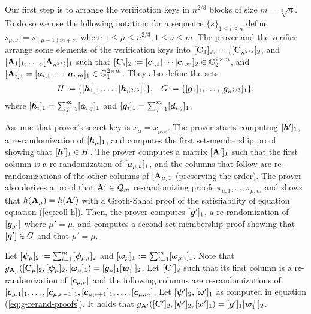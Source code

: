 Our first step is to arrange the verification keys in $n^{2/3}$ blocks of size $m=\sqrt[3]{n}$. To do so we use the following notation: for a sequence $\{s\}_{1\leq i \leq n}$ define $s_{\mu,\nu}:=s_{(\mu-1)m+\nu}$, where  $1\leq\mu\leq n^{2/3},1\leq \nu\leq m$. The prover and the verifier arrange some elements of the verification keys into $[\mathbf{{C}}_1]_2,\ldots, [\mathbf{{C}}_{n^{2/3}}]_2$, and $[\mathbf{{A}}_1]_1,\ldots, [\mathbf{{A}}_{n^{2/3}}]_1$ such that $[\mathbf{{C}}_i]_2:= [{\boldsymbol{c}}_{i,1}|\cdots|{\boldsymbol{c}}_{i,m}]_2\in\mathbb{G}_2^{2\times m}$,  and $[\mathbf{{A}}_i]_1=[{\boldsymbol{a}}_{i,1}|\cdots|{\boldsymbol{a}}_{i,m}]_1\in\mathbb{G}^{2\times m}_1$. They also define the sets
\begin{align*}
&H:=\{[{\boldsymbol{h}}_1]_1,\ldots,\allowbreak [{\boldsymbol{h}}_{n^{2/3}}]_1\},
&G:=\{[{\boldsymbol{g}}_1]_1,\ldots,[{\boldsymbol{g}}_{n^{2/3}}]_1\}, 
\end{align*}
where $[{\boldsymbol{h}}_i]_1 = \sum_{j=1}^m [{\boldsymbol{a}}_{i,j}]_1$ and $[{\boldsymbol{g}}_i]_1 =  \sum_{j=1}^m [{\boldsymbol{d}}_{i,j}]_1$.

Assume that prover's secret key is $x_\alpha = x_{\mu,\nu}$.
The prover starts computing $[{\boldsymbol{h}}']_1$,
a re-randomization of $[{\boldsymbol{h}}_\mu]_1$, and computes the first set-membership proof showing that $[{\boldsymbol{h}}']_1\in H$.
The prover computes a matrix $[\mathbf{{A}}']_1$ such that the first column is a re-randomization of $[{\boldsymbol{a}}_{\mu,\nu}]_1$, and the columns that follow are re-randomizations of the other columns of $[\mathbf{{A}}_\mu]_1$ (preserving the order). The prover also derives a proof that $\mathbf{{A}}'\in\mathcal{Q}_m$ re-randomizing proofs $\pi_{\mu,1},\ldots,\pi_{\mu,m}$ and shows that $h(\mathbf{{A}}_\mu)=h(\mathbf{{A}}')$ with a Groth-Sahai proof of the satisfiability of equation equation (\ref{eq:coll-h}). Then, the prover computes $[{\boldsymbol{g}}']_1$, a re-randomization of $[{\boldsymbol{g}}_{\mu'}]$ where $\mu'=\mu$, and computes a  second set-membership proof showing that $[{\boldsymbol{g}}']\in G$ and that $\mu'=\mu$.

Let $[{\boldsymbol{\psi}}_\mu]_2 := \sum_{i=1}^m[{\boldsymbol{\psi}}_{\mu,i}]_2$ and $[{\boldsymbol{\omega}}_\mu]_1 := \sum_{i=1}^m[{\boldsymbol{\omega}}_{\mu,i}]_1$. Note that $g_{\mathbf{{A}}_\mu}([\mathbf{{C}}_\mu]_2,\allowbreak[{\boldsymbol{\psi}}_\mu]_2,[{\boldsymbol{\omega}}_\mu]_1) = [{\boldsymbol{g}}_\mu]_1[{\boldsymbol{w}}_1^\top]_2$. Let $[\mathbf{{C}}']_2$ such that its first column is a re-ran\-do\-mi\-za\-tion of $[{\boldsymbol{c}}_{\mu,\nu}]$ and the following columns are re-ran\-do\-mi\-za\-tions of $[{\boldsymbol{c}}_{\mu,1}]_1,\ldots,\allowbreak[{\boldsymbol{c}}_{\mu,\nu-1}]_1,\allowbreak[{\boldsymbol{c}}_{\mu,\nu+1}]_1,\ldots,[{\boldsymbol{c}}_{\mu,m}]$. Let $[{\boldsymbol{\psi}}']_2,[{\boldsymbol{\omega}}']_1$ as computed in equation (\ref{eq:g-rerand-proofs}).  It holds that $g_{\mathbf{{A}}'}([\mathbf{{C}}']_2,[{\boldsymbol{\psi}}']_2,[{\boldsymbol{\omega}}']_1) = [{\boldsymbol{g}}']_1[{\boldsymbol{w}}_1^\top]_2$.

